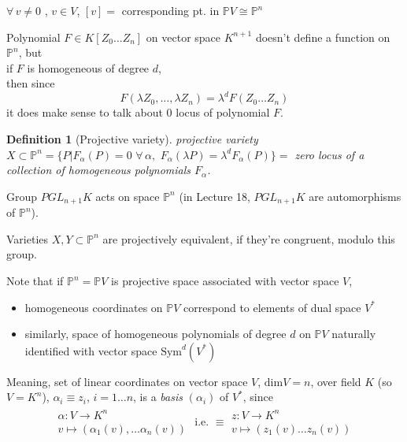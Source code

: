 \documentclass[10pt]{amsart}
\newtheorem{definition}{Definition}
\begin{document}
\begin{multicols*}{2}
$\forall \, v \neq 0$ , $v\in V$, $[v] = $ corresponding pt. in $\mathbb{P}V \cong \mathbb{P}^n$

Polynomial $F \in K[Z_0 \dots Z_n]$ on vector space $K^{n+1}$ doesn't define a function on $\mathbb{P}^n$, but \\
if $F$ is homogeneous of degree $d$, \\
\phantom{if }then since 
\[
	F(\lambda Z_0 , \dots , \lambda Z_n) = \lambda^d F(Z_0 \dots Z_n)
\]
it does make sense to talk about $0$ locus of polynomial $F$.

\begin{definition}[Projective variety]
	projective variety $X \subset \mathbb{P}^n = \lbrace P | F_{\alpha}(P) = 0 \, \, \forall \, \alpha, \, \, F_{\alpha}(\lambda P) = \lambda^d F_{\alpha}(P) \rbrace = $ zero locus of a collection of homogeneous polynomials $F_{\alpha}$. 
\end{definition}

Group $PGL_{n+1}K$ acts on space $\mathbb{P}^n$ (in Lecture 18, $PGL_{n+1}K$ are automorphisms of $\mathbb{P}^n$).

Varieties $X, Y \subset \mathbb{P}^n$ are projectively equivalent, if they're congruent, modulo this group.

Note that if $\mathbb{P}^n = \mathbb{P}V$ is projective space associated with vector space $V$, \\
\begin{itemize}
	\item homogeneous coordinates on $\mathbb{P}V$ correspond to elements of dual space $V^*$ 
	\item similarly, space of homogeneous polynomials of degree $d$ on $\mathbb{P}V$ naturally identified with vector space $\text{Sym}^d(V^*)$
\end{itemize}
Meaning, set of linear coordinates on vector space $V$, $\text{dim}V = n$, over field $K$ (so $V= K^n$), $\alpha_i \equiv z_i$, $i=1 \dots n$, is a \emph{basis} $(\alpha_i)$ of $V^*$, since 
\[
\begin{gathered}
	\begin{gathered}
	\alpha : V \to K^n \\
	v \mapsto (\alpha_1(v) , \dots \alpha_n(v)) 
	\end{gathered} \text{ i.e. } \equiv \begin{gathered}
	z : V \to K^n \\
	v \mapsto (z_1(v) \dots z_n(v))
	\end{gathered}
\end{gathered}
\]


\end{multicols*}
\end{document}
